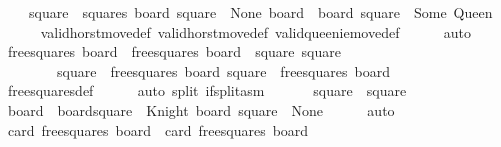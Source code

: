 \begin{isabellebody}
\ \ \ \ {\isachardoublequoteopen}square{\isacharprime}\ {\isasymin}\ squares{\isachardoublequoteclose}\ {\isachardoublequoteopen}board{\isacharprime}\ square{\isacharprime}\ {\isacharequal}\ None{\isachardoublequoteclose}\ {\isachardoublequoteopen}board{\isacharprime}{\isacharprime}\ {\isacharequal}\ board{\isacharprime}\ {\isacharparenleft}square{\isacharprime}\ {\isacharcolon}{\isacharequal}\ Some\ Queen{\isacharparenright}{\isachardoublequoteclose}\isanewline
\ \ \ \ \isamarkupfalse%
\ valid{\isacharunderscore}horst{\isacharunderscore}move{\isacharunderscore}def\ valid{\isacharunderscore}horst{\isacharunderscore}move{\isacharprime}{\isacharunderscore}def\ valid{\isacharunderscore}queenie{\isacharunderscore}move{\isacharunderscore}def\isanewline
\ \ \ \ \isamarkupfalse%
\ auto\isanewline
\ \ \isamarkupfalse%
\ {\isachardoublequoteopen}free{\isacharunderscore}squares\ board\ {\isacharequal}\ free{\isacharunderscore}squares\ board{\isacharprime}{\isacharprime}\ {\isasymunion}\ {\isacharbraceleft}square{\isacharcomma}\ square{\isacharprime}{\isacharbraceright}{\isachardoublequoteclose}\isanewline
\ \ \ \ \ \ \ \ {\isachardoublequoteopen}square\ {\isasymnotin}\ free{\isacharunderscore}squares\ board{\isacharprime}{\isacharprime}{\isachardoublequoteclose}\ {\isachardoublequoteopen}square{\isacharprime}\ {\isasymnotin}\ free{\isacharunderscore}squares\ board{\isacharprime}{\isacharprime}{\isachardoublequoteclose}\isanewline
\ \ \ \ \isamarkupfalse%
\ free{\isacharunderscore}squares{\isacharunderscore}def\isanewline
\ \ \ \ \isamarkupfalse%
\ {\isacharparenleft}auto\ split{\isacharcolon}\ if{\isacharunderscore}split{\isacharunderscore}asm{\isacharparenright}\isanewline
\ \ \isamarkupfalse%
\isanewline
\ \ \isamarkupfalse%
\ {\isachardoublequoteopen}square\ {\isasymnoteq}\ square{\isacharprime}{\isachardoublequoteclose}\isanewline
\ \ \ \ \isamarkupfalse%
\ {\isacartoucheopen}board{\isacharprime}\ {\isacharequal}\ board{\isacharparenleft}square\ {\isasymmapsto}\ Knight{\isacharparenright}{\isacartoucheclose}\ {\isacartoucheopen}board{\isacharprime}\ square{\isacharprime}\ {\isacharequal}\ None{\isacartoucheclose}\isanewline
\ \ \ \ \isamarkupfalse%
\ auto\isanewline
\ \ \isamarkupfalse%
\isanewline
\ \ \isamarkupfalse%
\ {\isachardoublequoteopen}card\ {\isacharparenleft}free{\isacharunderscore}squares\ board{\isacharparenright}\ {\isacharequal}\ card\ {\isacharparenleft}free{\isacharunderscore}squares\ board{\isacharprime}{\isacharprime}{\isacharparenright}\ {\isacharplus}\ {}{\isachardoublequoteclose}\isanewline

\end{isabellebody}
